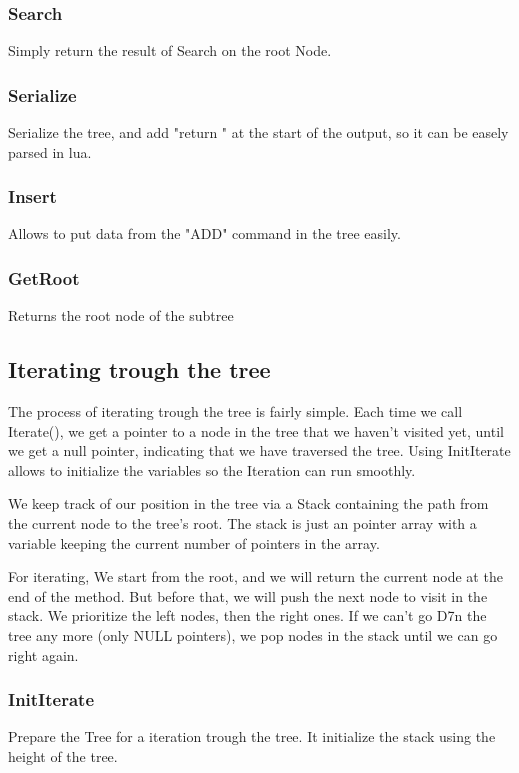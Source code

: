 \documentclass[10pt]{article}
\begin{document}
\subsubsection*{Search}
Simply return the result of Search on the root Node.

\subsubsection*{Serialize}
Serialize the tree, and add "return " at the start of the output, so it can be easely parsed in lua.

\subsubsection*{Insert}
Allows to put data from the "ADD" command in the tree easily.

\subsubsection*{GetRoot}
Returns the root node of the subtree

\subsection{Iterating trough the tree}
The process of iterating trough the tree is fairly simple. Each time we call Iterate(), we get a pointer to a node in the tree that we haven’t visited yet, until we get a null pointer, indicating that we have traversed the tree. Using InitIterate allows to initialize the variables so the Iteration can run smoothly.

We keep track of our position in the tree via a Stack containing the path from the current node to the tree's root. The stack is just an pointer array with a variable keeping the current number of pointers in the array.

For iterating, We start from the root, and we will return the current node at the end of the method. But before that, we will push the next node to visit in the stack. We prioritize the left nodes, then the right ones. If we can't go D7n the tree any more (only NULL pointers), we pop nodes in the stack until we can go right again.

\subsubsection*{InitIterate}
Prepare the Tree for a iteration trough the tree. It initialize the stack using the height of the tree.
\end{document}
